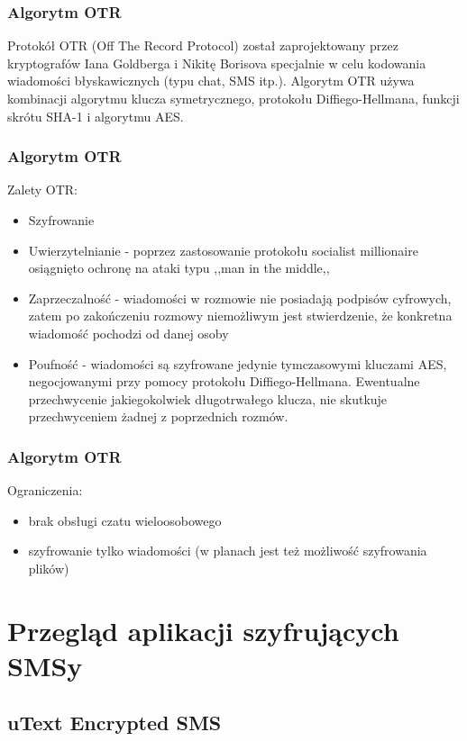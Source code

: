 \documentclass[xcolor=table]{beamer}
\begin{document}
\begin{frame}
  \frametitle{Algorytm OTR}
	
Protokół OTR (Off The Record Protocol) został zaprojektowany przez kryptografów Iana Goldberga i Nikitę Borisova
specjalnie w celu kodowania wiadomości błyskawicznych (typu chat, SMS itp.).
Algorytm OTR używa kombinacji algorytmu klucza symetrycznego, 
protokołu Diffiego-Hellmana, funkcji skrótu SHA-1 i algorytmu AES. 

\end{frame}

\begin{frame}
  \frametitle{Algorytm OTR}

Zalety OTR:
\begin{itemize}
\item Szyfrowanie
\item Uwierzytelnianie - poprzez zastosowanie protokołu socialist millionaire 
osiągnięto ochronę na ataki typu ,,man in the middle,,
\item Zaprzeczalność - wiadomości w rozmowie nie posiadają podpisów cyfrowych,
zatem po zakończeniu rozmowy niemożliwym jest stwierdzenie, że konkretna 
wiadomość pochodzi od danej osoby
\item Poufność - wiadomości są szyfrowane jedynie tymczasowymi kluczami AES, negocjowanymi przy pomocy protokołu Diffiego-Hellmana. Ewentualne przechwycenie jakiegokolwiek długotrwałego klucza, nie skutkuje przechwyceniem żadnej z poprzednich rozmów.
\end{itemize}
\end{frame}

\begin{frame}
  \frametitle{Algorytm OTR}
  
Ograniczenia:
\begin{itemize}
\item brak obsługi czatu wieloosobowego
\item szyfrowanie tylko wiadomości (w planach jest też możliwość szyfrowania plików)
\end{itemize}
\end{frame}

\section{Przegląd aplikacji szyfrujących SMSy}

\subsection{uText Encrypted SMS}
\end{document}
